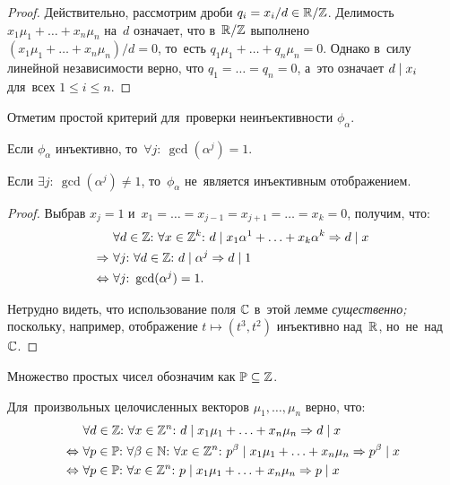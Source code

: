 \documentclass{article}
\begin{document}
\begin{proof}
    Действительно, рассмотрим дроби $q_i = x_i / d \in \mathbb{R} / \mathbb{Z}$. Делимость $x_1 \mu_1 + \ldots + x_n \mu_n$ на~$d$ означает,
    что в~$\mathbb{R} / \mathbb{Z}$ выполнено $(x_1 \mu_1 + \ldots + x_n \mu_n) / d = 0$, то~есть $q_1 \mu_1 + \ldots + q_n \mu_n = 0$.
    Однако в~силу линейной независимости верно, что $q_1 = \ldots = q_n = 0$, а~это означает $d \mid x_i$ для~всех $1 \leq i \leq n$.
\end{proof}

Отметим простой критерий для~проверки неинъективности $\phi_\alpha$.

\begin{lemma*}
    Если $\phi_\alpha$ инъективно, то~$\forall j{:}\ \gcd(\alpha^j) = 1$.
\end{lemma*}

\begin{consequence*}
    Если $\exists j{:}\ \gcd(\alpha^j) \neq 1$, то~$\phi_\alpha$ не~является инъективным отображением.
\end{consequence*}

\begin{proof}
    Выбрав $x_j = 1$ и~$x_1 = \ldots = x_{j - 1} = x_{j + 1} = \ldots = x_k = 0$, получим, что:
    \begin{align*}
                         & \forall d \in \mathbb{Z}{:}\ \forall x \in \mathbb{Z}^k{:}\ d \mid x_1 \alpha^1 + \ldots + x_k \alpha^k \Rightarrow d \mid x \\
            \Rightarrow\ & \forall j{:}\ \forall d \in \mathbb{Z}{:}\ d \mid \alpha^j \Rightarrow d \mid 1 \\
        \Leftrightarrow\ & \forall j{:}\ \gcd(\alpha^j) = 1.
    \end{align*}

    Нетрудно видеть, что использование поля $\mathbb{C}$ в~этой лемме \textit{существенно;} поскольку, например,
    отображение $t \mapsto (t^3, t^2)$ инъективно над~$\mathbb{R}$, но~не~над~$\mathbb{C}$.
\end{proof}

Множество простых чисел обозначим как $\mathbb{P} \subseteq \mathbb{Z}$.

\begin{lemma*}
    Для~произвольных целочисленных векторов $\mu_1, \ldots, \mu_n$ верно, что:
    \begin{align*}
                         & \forall d \in \mathbb{Z}{:}\ \forall x \in \mathbb{Z}^n{:}\ d \mid x_1 \mu_1 + \ldots + x_n \mu_n \Rightarrow d \mid x \\
        \Leftrightarrow\ & \forall p \in \mathbb{P}{:}\ \forall \beta \in \mathbb{N}{:}\ \forall x \in \mathbb{Z}^n{:}\ p^\beta \mid x_1 \mu_1 + \ldots + x_n \mu_n \Rightarrow p^\beta \mid x \\
        \Leftrightarrow\ & \forall p \in \mathbb{P}{:}\ \forall x \in \mathbb{Z}^n{:}\ p \mid x_1 \mu_1 + \ldots + x_n \mu_n \Rightarrow p \mid x
    \end{align*}
\end{lemma*}
\end{document}
